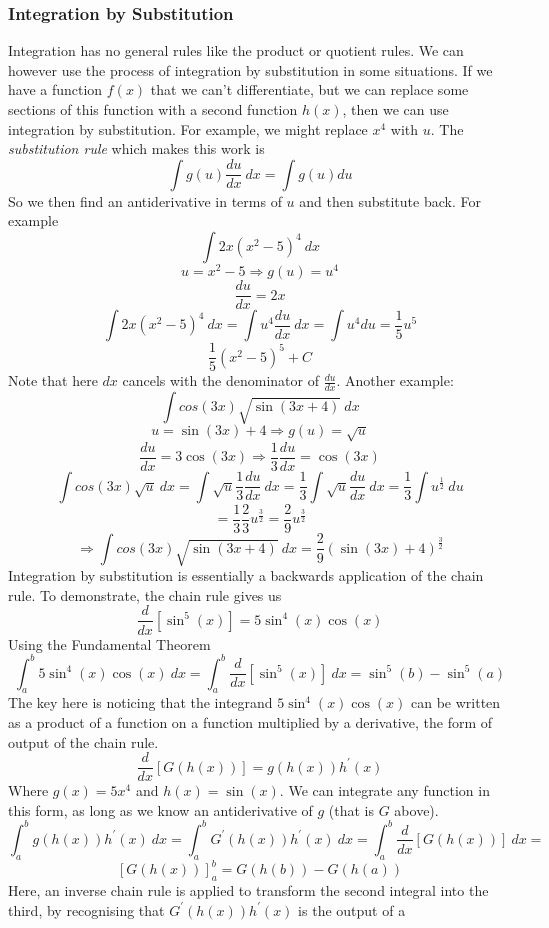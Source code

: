 \documentclass[12pt]{report}
\begin{document}
\begin{flushleft}
\subsubsection*{Integration by Substitution}
Integration has no general rules like the product or quotient rules.
We can however use the process of integration by substitution in some 
situations. If we have a function \(f(x)\) that we can't differentiate, but we
can replace some sections of this function with a second function \(h(x)\), 
then we can use integration by substitution. For example, we might replace 
\(x^4\) with  \(u\). The \textit{substitution rule} which makes this work is
\[\int g(u)\frac{du}{dx} \:dx = \int g(u) du\]
So we then find an antiderivative in terms of \(u\) and then substitute back.
For example
\[\int 2x(x^2 - 5)^4 \:dx\]
\[u = x^2 - 5 \Rightarrow g(u) = u^4\]
\[\frac{du}{dx} = 2x\]
\[\int 2x(x^2 - 5)^4 \:dx = \int u^4\frac{du}{dx} \:dx = \int u^4 du  
= \frac{1}{5}u^5\]
\[\frac{1}{5}(x^2 - 5)^5 + C\]
Note that here \(dx\) cancels with the denominator of \(\frac{du}{dx}\). 
Another example:
\[\int cos(3x) \sqrt{\sin(3x + 4)} \:dx\]
\[u = \sin(3x) + 4 \Rightarrow g(u) = \sqrt{u}\]
\[\frac{du}{dx} = 3\cos(3x) \Rightarrow \frac{1}{3}\frac{du}{dx} = \cos(3x)\]
\[\int cos(3x) \sqrt{u} \:dx = \int \sqrt{u}\frac{1}{3}\frac{du}{dx} \:dx
= \frac{1}{3}\int \sqrt{u}\frac{du}{dx} \:dx = \frac{1}{3}\int u^\frac{1}{2} 
\:du\]
\[= \frac{1}{3}\frac{2}{3}u^\frac{3}{2} = \frac{2}{9}u^\frac{3}{2}\]
\[\Rightarrow \int cos(3x) \sqrt{\sin(3x + 4)} \:dx = 
\frac{2}{9}(\sin(3x) + 4)^\frac{3}{2}\]
Integration by substitution is essentially a backwards application of the chain
rule. To demonstrate, the chain rule gives us
\[\frac{d}{dx}\left[\sin^5(x)\right] = 5\sin^4(x)\cos(x)\]
Using the Fundamental Theorem
\[\int_a^b 5\sin^4(x)\cos(x) \:dx = \int_a^b \frac{d}{dx}\left[\sin^5(x)\right]
\:dx = \sin^5(b) - \sin^5(a)\]
The key here is noticing that the integrand \(5\sin^4(x)\cos(x)\) can be 
written as a product of a function on a function multiplied by a derivative,
the form of output of the chain rule.
\[\frac{d}{dx}\left[G(h(x))\right] = g(h(x))h^\prime(x)\]
Where \(g(x) = 5x^4\) and \(h(x) = \sin(x)\). We can integrate any function in
this form, as long as we know an antiderivative of \(g\) (that is \(G\) above).
\[\int_a^b g(h(x))h^\prime(x) \:dx = \int_a^b G^\prime(h(x))h^\prime(x) \: dx
= \int_a^b \frac{d}{dx}\left[G(h(x))\right] \: dx = \]
\[\left[G(h(x))\right]_a^b = G(h(b)) - G(h(a))\]
Here, an inverse chain rule is applied to transform the second integral into
the third, by recognising that \(G^\prime(h(x))h^\prime(x)\) is the output of a

\end{flushleft}
\end{document}
